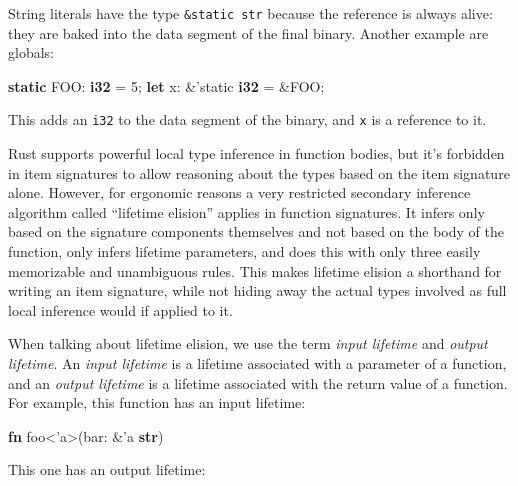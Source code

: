\documentclass[a4paper,]{book}
\newenvironment{Shaded}{\begin{snugshade}}{\end{snugshade}}
\newcommand{\KeywordTok}[1]{\textcolor[rgb]{0.13,0.29,0.53}{\textbf{{#1}}}}
\newcommand{\DecValTok}[1]{\textcolor[rgb]{0.00,0.00,0.81}{{#1}}}
\newcommand{\OtherTok}[1]{\textcolor[rgb]{0.56,0.35,0.01}{{#1}}}
\newcommand{\NormalTok}[1]{{#1}}
\begin{document}
String literals have the type \texttt{\&\textquotesingle{}static\ str}
because the reference is always alive: they are baked into the data
segment of the final binary. Another example are globals:

\begin{Shaded}
\begin{Highlighting}[]
\KeywordTok{static} \NormalTok{FOO: }\KeywordTok{i32} \NormalTok{= }\DecValTok{5}\NormalTok{;}
\KeywordTok{let} \NormalTok{x: &}\OtherTok{'static} \KeywordTok{i32} \NormalTok{= &FOO;}
\end{Highlighting}
\end{Shaded}

This adds an \texttt{i32} to the data segment of the binary, and
\texttt{x} is a reference to it.


Rust supports powerful local type inference in function bodies, but it's
forbidden in item signatures to allow reasoning about the types based on
the item signature alone. However, for ergonomic reasons a very
restricted secondary inference algorithm called ``lifetime elision''
applies in function signatures. It infers only based on the signature
components themselves and not based on the body of the function, only
infers lifetime parameters, and does this with only three easily
memorizable and unambiguous rules. This makes lifetime elision a
shorthand for writing an item signature, while not hiding away the
actual types involved as full local inference would if applied to it.

When talking about lifetime elision, we use the term \emph{input
lifetime} and \emph{output lifetime}. An \emph{input lifetime} is a
lifetime associated with a parameter of a function, and an \emph{output
lifetime} is a lifetime associated with the return value of a function.
For example, this function has an input lifetime:

\begin{Shaded}
\begin{Highlighting}[]
\KeywordTok{fn} \NormalTok{foo<}\OtherTok{'a}\NormalTok{>(bar: &}\OtherTok{'a} \KeywordTok{str}\NormalTok{)}
\end{Highlighting}
\end{Shaded}

This one has an output lifetime:
\end{document}
